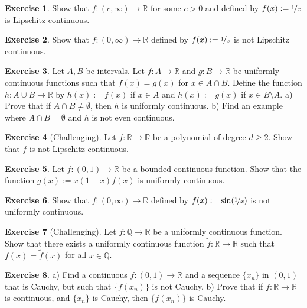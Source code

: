 \documentclass[12pt]{book}
\newcommand{\R}{{\mathbb{R}}}
\newcommand{\Q}{{\mathbb{Q}}}
\theoremstyle{plain}
\theoremstyle{remark}
\theoremstyle{definition}
\theoremstyle{exercise}
\newtheorem{exercise}{Exercise}[section]
\theoremstyle{example}
\begin{document}
\begin{exercise}
Show that $f \colon (c,\infty) \to \R$ for some $c > 0$
and defined by $f(x) := \nicefrac{1}{x}$ is Lipschitz continuous.
\end{exercise}

\begin{exercise}
Show that $f \colon (0,\infty) \to \R$
defined by $f(x) := \nicefrac{1}{x}$ is not Lipschitz continuous.
\end{exercise}

\begin{exercise}
Let $A, B$ be intervals.
Let $f \colon A \to \R$ and $g \colon B \to \R$ be uniformly continuous
functions such that $f(x) = g(x)$ for $x \in A \cap B$.  Define
the function $h \colon A \cup B \to \R$ by $h(x) := f(x)$ if
$x \in A$ and $h(x) := g(x)$ if $x \in B \setminus A$.
a) Prove that if $A \cap B \not= \emptyset$, then $h$ is uniformly continuous.
b) Find an example where $A \cap B = \emptyset$ and $h$ is not even
continuous.
\end{exercise}

\begin{exercise}[Challenging]
Let $f \colon \R \to \R$ be a polynomial of degree 
$d \geq 2$.  Show that $f$ is not Lipschitz
continuous.
\end{exercise}

\begin{exercise}
Let $f \colon (0,1) \to \R$ be a bounded continuous function.  Show that
the function
$g(x) := x(1-x)f(x)$ is uniformly continuous.
\end{exercise}

\begin{exercise}
Show that $f \colon (0,\infty) \to \R$ defined by $f(x) := \sin
(\nicefrac{1}{x})$ is not uniformly continuous.
\end{exercise}

\begin{exercise}[Challenging]
Let $f \colon \Q \to \R$ be a uniformly continuous function.  Show that
there exists a uniformly continuous function $\widetilde{f} \colon \R \to \R$
such that $f(x) = \widetilde{f}(x)$ for all $x \in \Q$.
\end{exercise}

\begin{exercise}
a) Find a continuous $f \colon (0,1) \to \R$ and a sequence $\{ x_n \}$ in
$(0,1)$ that is Cauchy, but such that $\{ f(x_n) \}$ is not Cauchy.
b) Prove that if $f \colon \R \to \R$ is continuous, and $\{ x_n \}$ is
Cauchy, then $\{ f(x_n) \}$ is Cauchy.
\end{exercise}
\end{document}
